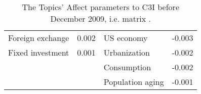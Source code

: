 \documentclass[10pt]{article}
\begin{document}
\begin {table}
\begin {center}
\begin {tabular} {llll}
Foreign exchange	         &	0.002	                                 &	US economy	                          &	-0.003	\\
Fixed investment	         &	0.001	                                 &	Urbanization	                           &	-0.002	\\
	                                  &		                                         &	Consumption	                           &	-0.002	\\
	                                   &		                                          &	Population aging	                  &	-0.001	\\\hline                  
 \end {tabular}
 \caption{The Topics' Affect parameters to C3I before December 2009, i.e. matrix .}
 \label{matrixA}
 \end{center}
 \end {table}
\end{document}
